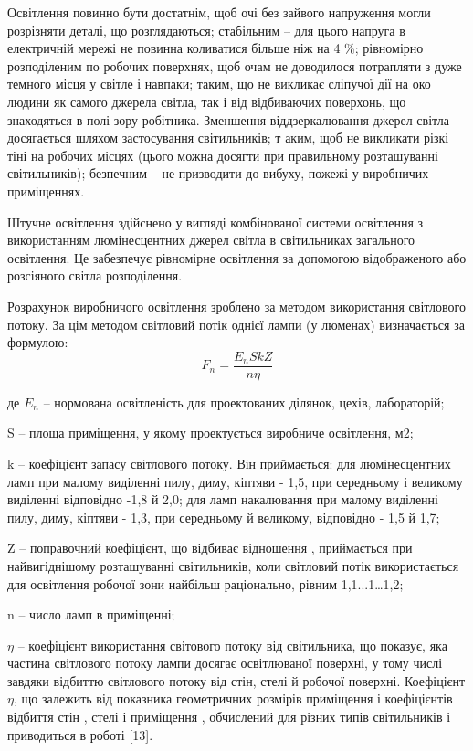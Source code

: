 Освітлення повинно бути достатнім, щоб очі без зайвого напруження могли розрізняти деталі, що розглядаються; стабільним – 
для цього напруга в електричній мережі не повинна коливатися більше ніж на 4 \%; 
рівномірно розподіленим по робочих поверхнях, щоб очам не доводилося 
потрапляти з дуже темного місця у світле і навпаки; 
таким, що не викликає сліпучої дії на око людини як самого джерела 
світла, так і від відбиваючих поверхонь, що знаходяться в полі зору робітника. 
Зменшення віддзеркалювання джерел світла досягається шляхом застосування світильників; т
аким, щоб не викликати різкі тіні на робочих місцях (цього можна досягти при правильному 
розташуванні світильників); безпечним – не призводити до вибуху, пожежі у виробничих приміщеннях.


Штучне освітлення здійснено у вигляді комбінованої системи освітлення з 
використанням люмінесцентних джерел світла в світильниках загального освітлення. 
Це забезпечує рівномірне освітлення за допомогою відображеного або розсіяного 
світла розподілення.

Розрахунок виробничого освітлення зроблено за методом використання 
світлового потоку. За цім методом світловий потік однієї лампи (у люменах) визначається за формулою:
\begin{equation}
\label{eq:fnop}
 F_n = \frac{E_{n}SkZ}{n \eta}
\end{equation}
\begin{ESKDexplanation}
\item де $E_n$ -- нормована освітленість для проектованих ділянок, цехів, лабораторій;
\item S – площа приміщення, у якому проектується виробниче освітлення, м2;
\item k – коефіцієнт запасу світлового потоку. Він приймається: для люмінесцентних ламп при малому виділенні пилу, диму, кіптяви - 1,5, при середньому і великому виділенні відповідно -1,8 й 2,0; для ламп накалювання при малому виділенні пилу, диму, кіптяви - 1,3, при середньому й великому, відповідно - 1,5 й 1,7;
\item Z – поправочний коефіцієнт, що відбиває відношення  , приймається при найвигіднішому розташуванні світильників, коли світловий потік використається для освітлення робочої зони найбільш раціонально, рівним 1,1...1…1,2; 
\item n – число ламп в приміщенні;
\item  $\eta$ – коефіцієнт використання світового потоку від світильника, що показує, яка частина світлового потоку лампи   досягає освітлюваної поверхні, у тому числі завдяки відбиттю світлового потоку від стін, стелі й робочої поверхні.
Коефіцієнт $\eta$, що залежить від показника геометричних розмірів приміщення   і коефіцієнтів відбиття стін  , стелі   і приміщення  , обчислений для різних типів світильників і приводиться в роботі [13].	  
\end{ESKDexplanation}

